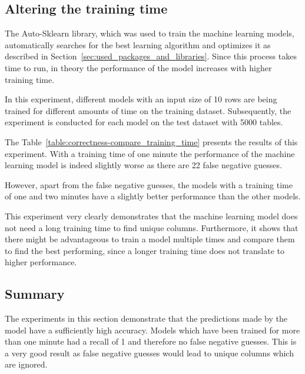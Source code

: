 


\subsection{Altering the training time}\label{subsec:correctness_comparing-training-time}
The Auto-Sklearn library, which was used to train the machine learning models, automatically searches for the best learning algorithm and optimizes it as described in Section~\ref{sec:used_packages_and_libraries}. Since this process takes time to run, in theory the performance of the model increases with higher training time. %

In this experiment, different models with an input size of \num{10} rows are being trained for different amounts of time on the training dataset. Subsequently, the experiment is conducted for each model on the test dataset with \num{5000} tables.

The Table~\ref{table:correctness-compare_training_time} presents the results of this experiment. With a training time of one minute the performance of the machine learning model is indeed slightly worse as there are \num{22} false negative guesses.

However, apart from the false negative guesses, the models with a training time of one and two minutes have a slightly better performance than the other models. %

This experiment very clearly demonstrates that the machine learning model does not need a long training time to find unique columns. Furthermore, it shows that there might be advantageous to train a model multiple times and compare them to find the best performing, since a longer training time does not translate to higher performance.




\subsection{Summary}\label{subsec:correctness_conclusions}
The experiments in this section demonstrate that the predictions made by the model have a sufficiently high accuracy. Models which have been trained for more than one minute had a recall of 1 and therefore no false negative guesses. This is a very good result as false negative guesses would lead to unique columns which are ignored.

